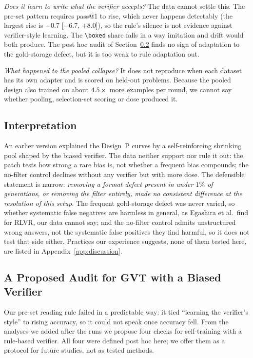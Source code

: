 \documentclass[runningheads]{llncs}
\begin{document}
\emph{Does it learn to write what the verifier accepts?} The data cannot settle
this. The pre-set pattern requires pass@1 to rise, which never happens
detectably (the largest rise is $+0.7$ [$-6.7$, $+8.0$]), so the rule's silence
is not evidence against verifier-style learning. The \verb|\boxed| share falls
in a way imitation and drift would both produce. The post hoc audit of
Section~\ref{sec:audit} finds no sign of adaptation to the gold-storage
defect, but it is too weak to rule adaptation out.

\emph{What happened to the pooled collapse?} It does not reproduce when each
dataset has its own adapter and is scored on held-out problems. Because the
pooled design also trained on about $4.5\times$ more examples per round, we
cannot say whether pooling, selection-set scoring or dose produced it.

\subsection{Interpretation}
\label{sec:threevars}

An earlier version explained the Design~P curves by a self-reinforcing
shrinking pool shaped by the biased verifier. The data neither support nor rule
it out: the patch tests how strong a rare bias is, not whether a frequent bias
compounds; the no-filter control declines without any verifier but with more
dose. The defensible statement is narrow: \emph{removing a format defect present
in under $1\%$ of generations, or removing the filter entirely, made no
consistent difference at the resolution of this setup}. The frequent gold-storage
defect was never varied, so whether systematic false negatives are harmless in
general, as Egashira et al.\ find for RLVR, our data cannot say; and the
no-filter control admits unstructured wrong answers, not the systematic false
positives they find harmful, so it does not test that side either. Practices
our experience suggests, none of them tested here, are listed in
Appendix~\ref{app:discussion}.

\subsection{A Proposed Audit for GVT with a Biased Verifier}
\label{sec:audit}

Our pre-set reading rule failed in a predictable way: it tied ``learning the
verifier's style'' to rising accuracy, so it could not speak once accuracy fell.
From the analyses we added after the runs we propose four checks for
self-training with a rule-based verifier. All four were defined post hoc here;
we offer them as a protocol for future studies, not as tested methods.
\end{document}
